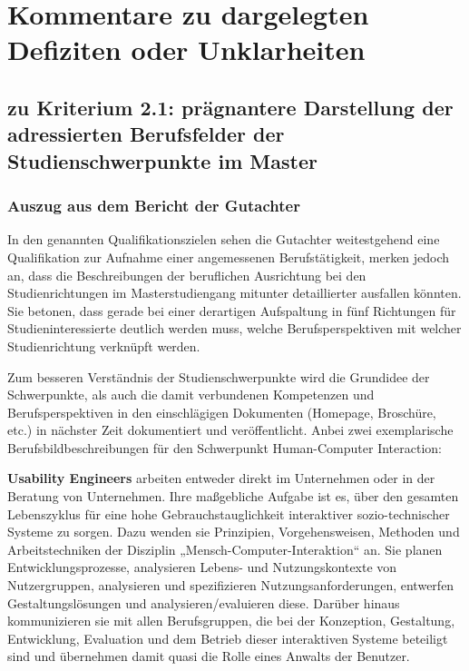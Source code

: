 \chapter{Kommentare zu dargelegten Defiziten oder
Unklarheiten}\label{kommentare-zu-dargelegten-defiziten-oder-unklarheiten}

\section{zu Kriterium 2.1: prägnantere Darstellung der adressierten
Berufsfelder der Studienschwerpunkte im
Master}\label{zu-kriterium-2.1-pruxe4gnantere-darstellung-der-adressierten-berufsfelder-der-studienschwerpunkte-im-master}

\subsection{Auszug aus dem Bericht der
Gutachter}\label{auszug-aus-dem-bericht-der-gutachter}

\begin{siderules}
In den genannten Qualifikationszielen sehen die Gutachter weitestgehend
eine Qualifikation zur Aufnahme einer angemessenen Berufstätigkeit,
merken jedoch an, dass die Beschreibungen der beruflichen Ausrichtung
bei den Studienrichtungen im Masterstudiengang mitunter detaillierter
ausfallen könnten. Sie betonen, dass gerade bei einer derartigen
Aufspaltung in fünf Richtungen für Studieninteressierte deutlich werden
muss, welche Berufsperspektiven mit welcher Studienrichtung verknüpft
werden.
\end{siderules}

Zum besseren Verständnis der Studienschwerpunkte wird die Grundidee der
Schwerpunkte, als auch die damit verbundenen Kompetenzen und
Berufsperspektiven in den einschlägigen Dokumenten (Homepage, Broschüre,
etc.) in nächster Zeit dokumentiert und veröffentlicht. Anbei zwei
exemplarische Berufsbildbeschreibungen für den Schwerpunkt
Human-Computer Interaction:

\textbf{Usability Engineers} arbeiten entweder direkt im Unternehmen
oder in der Beratung von Unternehmen. Ihre maßgebliche Aufgabe ist es,
über den gesamten Lebenszyklus für eine hohe Gebrauchstauglichkeit
interaktiver sozio-technischer Systeme zu sorgen. Dazu wenden sie
Prinzipien, Vorgehensweisen, Methoden und Arbeitstechniken der Disziplin
„Mensch-Computer-Interaktion`` an. Sie planen Entwicklungsprozesse,
analysieren Lebens- und Nutzungskontexte von Nutzergruppen, analysieren
und spezifizieren Nutzungsanforderungen, entwerfen Gestaltungslösungen
und analysieren/evaluieren diese. Darüber hinaus kommunizieren sie mit
allen Berufsgruppen, die bei der Konzeption, Gestaltung, Entwicklung,
Evaluation und dem Betrieb dieser interaktiven Systeme beteiligt sind
und übernehmen damit quasi die Rolle eines Anwalts der Benutzer.

